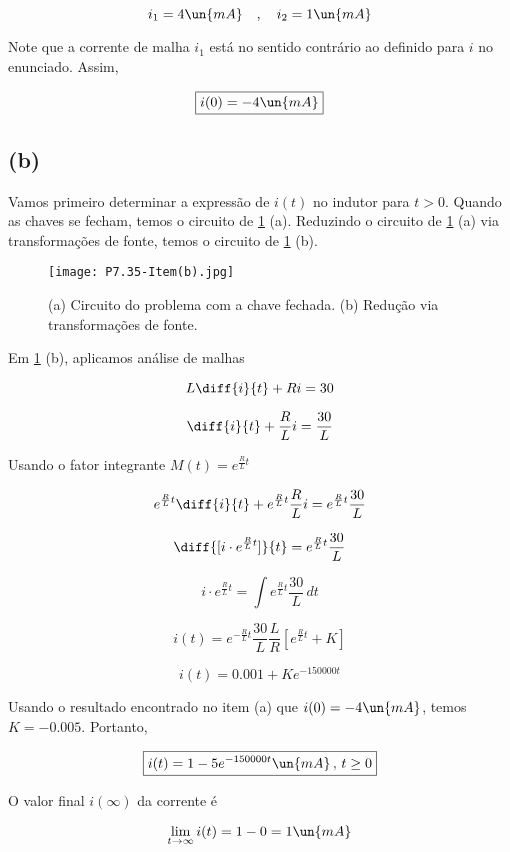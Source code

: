 \endgroup

\[ i_1 = 4 \un{mA} \quad , \quad i_2 = 1 \un{mA}   \]

Note que a corrente de malha $i_1$ está no sentido contrário ao definido para $i$ no enunciado. Assim, 

\[ \boxed{i(0) = - 4 \un{mA}}  \]

\subsection*{(b)}

Vamos primeiro determinar a expressão de $i(t)$ no indutor para $t>0$. Quando as chaves se fecham, temos o circuito
de \ref*{fig:7.35.1} (a). Reduzindo o circuito de \ref*{fig:7.35.1} (a) via transformações de fonte, 
temos o circuito de \ref*{fig:7.35.1} (b).

\begin{figure}
    \centering
    \caption{(a) Circuito do problema com a chave fechada. (b) Redução via transformações de fonte.}
      \centering
      \texttt{[image: P7.35-Item(b).jpg]} \\
    \label{fig:7.35.1}
\end{figure}

Em \ref*{fig:7.35.1} (b), aplicamos análise de malhas   

\[ L\diff{i}{t} + Ri = 30 \]

\[ \diff{i}{t} + \frac{R}{L}i = \frac{30}{L} \]

Usando o fator integrante $M(t) = e^{\frac{R}{L}t}$

\[ e^{\frac{R}{L}t}\diff{i}{t} + e^{\frac{R}{L}t}\frac{R}{L}i = e^{\frac{R}{L}t}\frac{30}{L} \]

\[ \diff{[i \cdot e^{\frac{R}{L}t}]}{t} = e^{\frac{R}{L}t}\frac{30}{L} \]

\[ i \cdot e^{\frac{R}{L}t} = \int e^{\frac{R}{L}t}\frac{30}{L} \, dt  \]

\[ i(t)  = e^{- \frac{R}{L}t} \frac{30}{L} \frac{L}{R} \left[e^{\frac{R}{L}t} + K\right] \]

\[ i(t)  = 0.001 + Ke^{- 150000t} \]

Usando o resultado encontrado no item (a) que $i(0) = - 4 \un{mA}$, temos $K = - 0.005$. Portanto,   

\[ \boxed{i(t) = 1 - 5e^{- 150000t} \un{mA} \, , \, t \geq 0}  \]

O valor final $i(\infty)$ da corrente é    

\[ \displaystyle \lim_{t\to \infty} i(t) = 1 - 0 = 1 \un{mA}  \]

